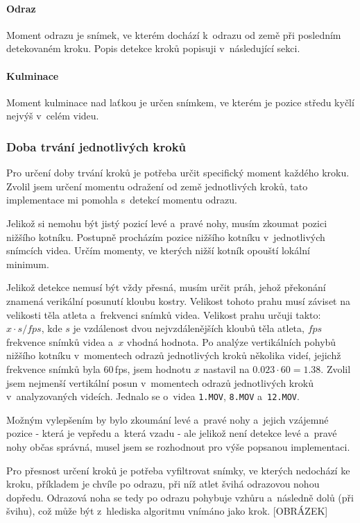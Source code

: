 \paragraph{Odraz}

Moment odrazu je snímek, ve kterém dochází k~odrazu od země při posledním detekovaném kroku. Popis detekce kroků popisuji v~následující sekci.

\paragraph{Kulminace}

Moment kulminace nad laťkou je určen snímkem, ve kterém je pozice středu kyčlí nejvýš v~celém videu.


\subsubsection{Doba trvání jednotlivých kroků}

Pro určení doby trvání kroků je potřeba určit specifický moment každého kroku. Zvolil jsem určení momentu odražení od země jednotlivých kroků, tato implementace mi pomohla s~detekcí momentu odrazu.

Jelikož si nemohu být jistý pozicí levé a~pravé nohy, musím zkoumat pozici nižšího kotníku. Postupně procházím pozice nižšího kotníku v~jednotlivých snímcích videa. Určím momenty, ve kterých nižší kotník opouští lokální minimum.

Jelikož detekce nemusí být vždy přesná, musím určit práh, jehož překonání znamená verikální posunutí kloubu kostry. Velikost tohoto prahu musí záviset na velikosti těla atleta a~frekvenci snímků videa. Velikost prahu určuji takto: $x\cdot s/fps$, kde $s$ je vzdálenost dvou nejvzdálenějších kloubů těla atleta, $fps$ frekvence snímků videa a~$x$ vhodná hodnota. Po analýze vertikálních pohybů nižšího kotníku v~momentech odrazů jednotlivých kroků několika videí, jejichž frekvence snímků byla $60$\,\rm fps, jsem hodnotu $x$ nastavil na $0.023\cdot 60=1.38$. Zvolil jsem nejmenší vertikální posun v~momentech odrazů jednotlivých kroků v~analyzovaných videích. Jednalo se o~videa \texttt{1.MOV}, \texttt{8.MOV} a~\texttt{12.MOV}.

Možným vylepšením by bylo zkoumání levé a~pravé nohy a~jejich vzájemné pozice - která je vepředu a~která vzadu - ale jelikož není detekce levé a~pravé nohy občas správná, musel jsem se rozhodnout pro výše popsanou implementaci.

Pro přesnost určení kroků je potřeba vyfiltrovat snímky, ve kterých nedochází ke kroku, příkladem je chvíle po odrazu, při níž atlet švihá odrazovou nohou dopředu. Odrazová noha se tedy po odrazu pohybuje vzhůru a~následně dolů (při švihu), což může být z~hlediska algoritmu vnímáno jako krok. [OBRÁZEK]

